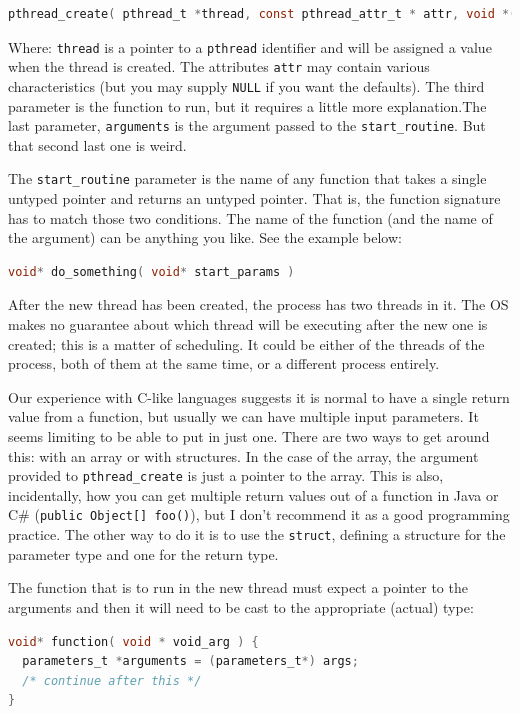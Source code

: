 \documentclass[a4paper]{report}
\begin{document}
\begin{lstlisting}[language=C]
pthread_create( pthread_t *thread, const pthread_attr_t * attr, void *(*start_routine)( void * ), void *arg );
\end{lstlisting}

Where: \texttt{thread} is a pointer to a \texttt{pthread} identifier and will be assigned a value when the thread is created. The attributes \texttt{attr} may contain various characteristics (but you may supply \texttt{NULL} if you want the defaults). The third parameter is the function to run, but it requires a little more explanation.The last parameter, \texttt{arguments} is the argument passed to the \texttt{start\_routine}. But that second last one is weird.

The \texttt{start\_routine} parameter is the name of any function that takes a single untyped pointer and returns an untyped pointer. That is, the function signature has to match those two conditions. The name of the function (and the name of the argument) can be anything you like. See the example below:

\begin{lstlisting}[language=C]
void* do_something( void* start_params )
\end{lstlisting}


After the new thread has been created, the process has two threads in it. The OS makes no guarantee about which thread will be executing after the new one is created; this is a matter of scheduling. It could be either of the threads of the process, both of them at the same time, or a different process entirely.

Our experience with C-like languages suggests it is normal to have a single return value from a function, but usually we can have multiple input parameters. It seems limiting to be able to put in just one. There are two ways to get around this: with an array or with structures. In the case of the array, the argument provided to \texttt{pthread\_create} is just a pointer to the array. This is also, incidentally, how you can get multiple return values out of a function in Java or C\# (\texttt{public Object[] foo()}), but I don't recommend it as a good programming practice. The other way to do it is to use the \texttt{struct}, defining a structure for the parameter type and one for the return type.

The function that is to run in the new thread must expect a pointer to the arguments and then it will need to be cast to the appropriate (actual) type:
\begin{lstlisting}[language=C]
void* function( void * void_arg ) {
  parameters_t *arguments = (parameters_t*) args;
  /* continue after this */
}
\end{lstlisting}
\end{document}
